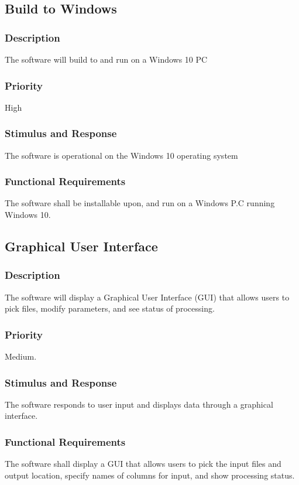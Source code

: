 \subsection{Build to Windows}
\subsubsection{Description}
 The software will build to and run on a Windows 10 PC
\subsubsection{Priority}
High
\subsubsection{Stimulus and Response}
The software is operational on the Windows 10 operating system
\subsubsection{Functional Requirements}
The software shall be installable upon, and run on a Windows P.C running Windows 10.

  \subsection{Graphical User Interface}
\subsubsection{Description}
 The software will display a Graphical User Interface (GUI) that allows users to pick files, modify parameters, and see status of processing.
\subsubsection{Priority}
Medium.

\subsubsection{Stimulus and Response}
The software responds to user input and displays data through a graphical interface.

\subsubsection{Functional Requirements}
The software shall display a GUI that allows users to pick the input files and output location, specify names of columns for input, and show processing status.
 
